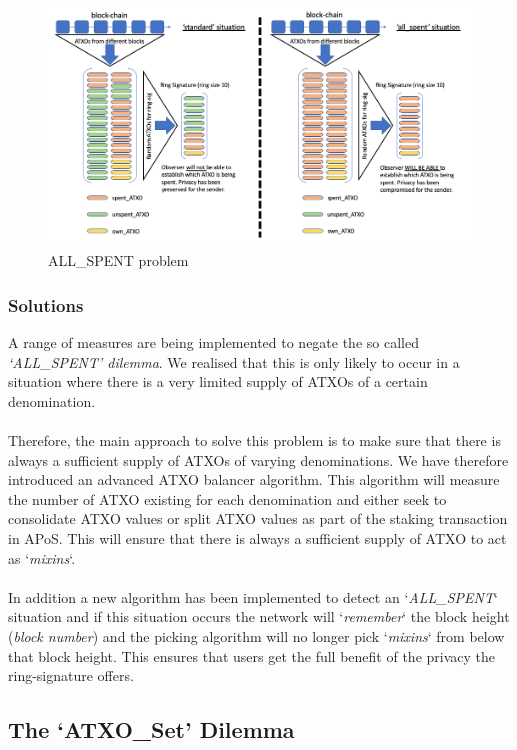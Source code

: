 \begin{figure}[ht]
    \centering
    \includegraphics[width=\textwidth]{Images/allspentproblem.png}
    \caption{ALL\_SPENT problem}
    \label{fig:my_label}
\end{figure}

\subsubsection{Solutions}
A range of measures are being implemented to negate the so called
\textit{‘ALL\_SPENT’ dilemma}. We realised that this is only likely
to occur in a situation where there is a very limited supply of
ATXOs of a certain denomination.
\\
\\
\noindent
Therefore, the main approach to solve this problem is to make sure that
there is always a sufficient supply of ATXOs of varying denominations.
We have therefore introduced an advanced ATXO balancer algorithm. This
algorithm will measure the number of ATXO existing for each denomination
and either seek to consolidate ATXO values or split ATXO values as part
of the staking transaction in APoS. This will ensure that there is
always a sufficient supply of ATXO to act as ‘\textit{mixins}‘.
\\
\\
\noindent
In addition a new algorithm has been implemented to detect an
‘\textit{ALL\_SPENT}‘ situation and if this situation occurs
the network will ‘\textit{remember}‘ the block height (\textit{block number})
and the picking algorithm will no longer pick ‘\textit{mixins}‘
from below that block height. This ensures that users get the full
benefit of the privacy the ring-signature offers.



\subsection{The ‘ATXO\_Set’ Dilemma}

